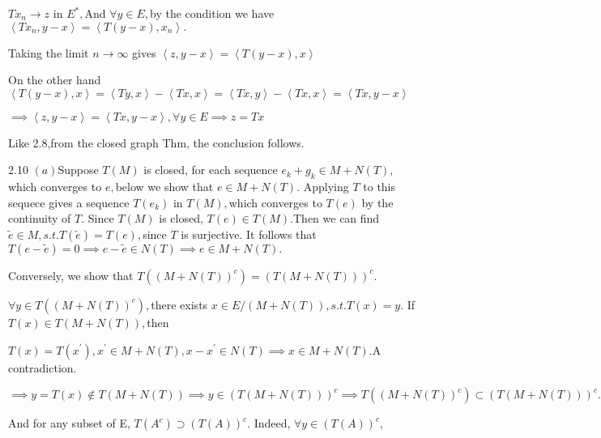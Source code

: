 \documentclass{article}
\begin{document}
$Tx_{n}\rightarrow z$ in $E^{\ast },$And $\forall y\in E,$by the condition
we have $\left\langle Tx_{n},y-x\right\rangle =\left\langle T\left(
y-x\right) ,x_{n}\right\rangle .$

Taking the limit $n\rightarrow \infty $ gives $\left\langle
z,y-x\right\rangle =\left\langle T\left( y-x\right) ,x\right\rangle $

On the other hand $\left\langle T\left( y-x\right) ,x\right\rangle
=\left\langle Ty,x\right\rangle -\left\langle Tx,x\right\rangle
=\left\langle Tx,y\right\rangle -\left\langle Tx,x\right\rangle
=\left\langle Tx,y-x\right\rangle $

$\implies \left\langle z,y-x\right\rangle =\left\langle Tx,y-x\right\rangle
,\forall y\in E\implies z=Tx$

\bigskip Like 2.8,from the closed graph Thm, the conclusion follows.

2.10 $\left( a\right) $Suppose $T\left( M\right) $ is closed, for each
sequence $e_{k}+g_{k}\in M+N\left( T\right) ,$which converges to $e,$below
we show that $e\in M+N\left( T\right) .$ Applying $T$ to this sequece gives
a sequence $T\left( e_{k}\right) $ in $T\left( M\right) ,$which converges to 
$T\left( e\right) $ by the continuity of $T$. Since $T\left( M\right) $ is
closed, $T\left( e\right) \in T\left( M\right) .$Then we can find $\tilde{e}%
\in M,s.t.T\left( \tilde{e}\right) =T\left( e\right) ,$since $T$ is
surjective. It follows that $T\left( e-\tilde{e}\right) =0\implies e-\tilde{e%
}\in N\left( T\right) \implies e\in M+N\left( T\right) .$

Conversely, we show that $T\left( \left( M+N\left( T\right) \right)
^{c}\right) =\left( T\left( M+N\left( T\right) \right) \right) ^{c}.$

$\forall y\in T\left( \left( M+N\left( T\right) \right) ^{c}\right) ,$there
exists $x\in E/\left( M+N\left( T\right) \right) ,s.t.T\left( x\right) =y.$
If $T\left( x\right) \in T\left( M+N\left( T\right) \right) ,$then

$T\left( x\right) =T\left( x^{\prime }\right) ,x^{\prime }\in M+N\left(
T\right) ,x-x^{\prime }\in N\left( T\right) \implies x\in M+N\left( T\right)
.$A contradiction.

$\implies y=T\left( x\right) \notin T\left( M+N\left( T\right) \right)
\implies y\in \left( T\left( M+N\left( T\right) \right) \right) ^{c}\implies
T\left( \left( M+N\left( T\right) \right) ^{c}\right) \subset \left( T\left(
M+N\left( T\right) \right) \right) ^{c}.$

And for any subset of E, $T\left( A^{c}\right) \supset \left( T\left(
A\right) \right) ^{c}$. Indeed, $\forall y\in \left( T\left( A\right)
\right) ^{c},$
\end{document}
